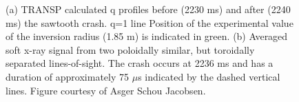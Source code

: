 \begin{figure}[h!]
    \centering
    \caption{(a) TRANSP calculated q profiles before (2230 ms) and after (2240 ms) the sawtooth crash. q=1 line Position of the experimental value of the inversion radius (1.85 m) is indicated in green. (b) Averaged soft x-ray signal from two poloidally similar, but toroidally separated lines-of-sight. The crash occurs at 2236 ms and has a duration of approximately 75 $\mu$s indicated by the dashed vertical lines. Figure courtesy of Asger Schou Jacobsen. }
\end{figure}

